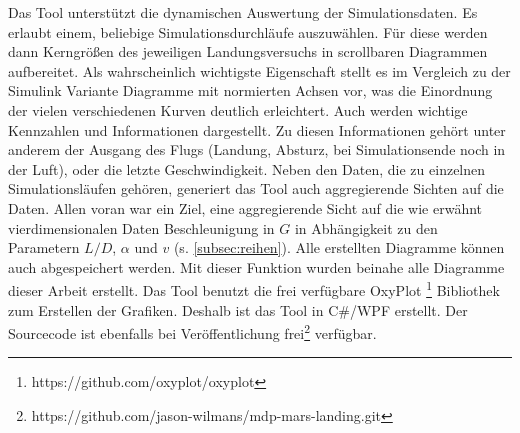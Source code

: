 \label{subsec:tool}
Das Tool unterstützt die dynamischen Auswertung der Simulationsdaten. Es erlaubt einem, beliebige Simulationsdurchläufe auszuwählen. Für diese werden dann Kerngrößen des jeweiligen Landungsversuchs in scrollbaren Diagrammen aufbereitet. Als wahrscheinlich wichtigste Eigenschaft stellt es im Vergleich zu der Simulink Variante Diagramme mit normierten Achsen vor, was die Einordnung der vielen verschiedenen Kurven deutlich erleichtert. Auch werden wichtige Kennzahlen und Informationen dargestellt. Zu diesen Informationen gehört unter anderem der Ausgang des Flugs (Landung, Absturz, bei Simulationsende noch in der Luft), oder die letzte Geschwindigkeit.
Neben den Daten, die zu einzelnen Simulationsläufen gehören, generiert das Tool auch aggregierende Sichten auf die Daten. Allen voran war ein Ziel, eine aggregierende Sicht auf die wie erwähnt vierdimensionalen Daten Beschleunigung in $G$ in Abhängigkeit zu den Parametern $L/D$, $\alpha$ und $v$ (s. \ref{subsec:reihen}). Alle erstellten Diagramme können auch abgespeichert werden. Mit dieser Funktion wurden beinahe alle Diagramme dieser Arbeit erstellt. Das Tool benutzt die frei verfügbare OxyPlot \footnote{https://github.com/oxyplot/oxyplot} Bibliothek zum Erstellen der Grafiken. Deshalb ist das Tool in C\#/WPF erstellt. Der Sourcecode ist ebenfalls bei Veröffentlichung frei\footnote{https://github.com/jason-wilmans/mdp-mars-landing.git} verfügbar.
